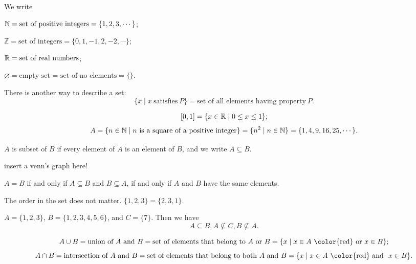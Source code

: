   \begin{definition}
    We write

    $\mathbb{N} = \text{set of positive integers} = \{1, 2, 3,\cdots\}$;

    $\mathbb{Z} = \text{set of integers} = \{0, 1, -1, 2, -2,\cdots\}$;

    $\mathbb{R} = \text{set of real numbers}$;

    $\varnothing = \text{empty set = set of no elements} = \{\}$.
  \end{definition}

  There is another way to describe a set:
  \[
    \{x \mid x~ \text{satisfies}~ P\} = \text{set of all elements having property}~
    P.
  \]

  \begin{example}
    \[
      [0,1] = \{x \in\mathbb{R}\mid 0 \le x \le 1\};
    \]
    \[
      A = \{n\in \mathbb{N}\mid n~ \text{is a square of a positive integer}\} = \{n^2\mid n\in \mathbb{N}\} = \{1 ,4,
      9, 16, 25, \cdots\}.
    \]
  \end{example}

  \begin{definition}[Subsets]
    $A$ is subset of $B$ if every element of $A$ is an element of $B$, and we
    write $A \subseteq B$.
  \end{definition}

  {\color{red} insert a venn's graph here!} 

  \begin{remark}
    $A = B$ if and only if $A\subseteq B$ and $B\subseteq A$, if and only if $A$
    and $B$ have the same elements.

    The order in the set does not matter. $\{1,2,3\} = \{2, 3, 1\}$.
  \end{remark}
  \begin{example}
    $A = \{1, 2, 3\}$, $B= \{1, 2, 3, 4, 5, 6\}$, and $C = \{7\}$. Then we have
    \[
      A \subseteq B, A\nsubseteq C, B\nsubseteq A.
    \]
  \end{example}

  \begin{definition}
    \[
      A \cup B = \text{union of } A~\text{and}~B = \text{set of elements that
        belong to } A~\text{or}~B = \{x\mid x\in A~\text{{\color{red} or}}~x\in B\};
    \]
    \[
      A \cap B = \text{intersection of } A~\text{and}~B = \text{set of elements that
        belong to both } A~\text{and}~B = \{x\mid x\in A~\text{{\color{red} and} }~x\in B\}.
    \]
  \end{definition}

